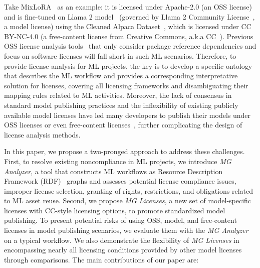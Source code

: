 Take MixLoRA~\cite{li2024mixlora} as an example: it is licensed under Apache-2.0 (an OSS license) and is fine-tuned on Llama 2 model~\cite{touvron2023llama} (governed by Llama 2 Community License~\cite{meta2024llama2}, a model license) using the Cleaned Alpaca Dataset~\cite{taori2023alpaca}, which is licensed under CC BY-NC-4.0 (a free-content license from Creative Commons, a.k.a CC~\cite{creative2024list}).
Previous OSS license analysis tools~\cite{mathur2012empirical,ombredanne2020free} that only consider package reference dependencies and focus on software licenses will fall short in such ML scenarios.
Therefore, to provide license analysis for ML projects, the key is to develop a specific ontology that describes the ML workflow and provides a corresponding interpretative solution for licenses, covering all licensing frameworks and disambiguating their mapping rules related to ML activities.
Moreover, the lack of consensus in standard model publishing practices and the inflexibility of existing publicly available model licenses have led many developers to publish their models under OSS licenses or even free-content licenses~\cite{groeneveld2024olmo,cohereforai2024c4ai}, further complicating the design of license analysis methods.

In this paper, we propose a two-pronged approach to address these challenges. 
First, to resolve existing noncompliance in ML projects, we introduce \textit{MG Analyzer}, a tool that constructs ML workflows as Resource Description Framework (RDF)~\cite{pan2009resource} graphs and assesses potential license compliance issues, improper license selection, granting of rights, restrictions, and obligations related to ML asset reuse. 
Second, we propose \textit{MG Licenses}, a new set of model-specific licenses with CC-style licensing options, to promote standardized model publishing.
To present potential risks of using OSS, model, and free-content licenses in model publishing scenarios, we evaluate them with the \emph{MG Analyzer} on a typical workflow.
We also demonstrate the flexibility of \textit{MG Licenses} in encompassing nearly all licensing conditions provided by other model licenses through comparisons.
The main contributions of our paper are:

